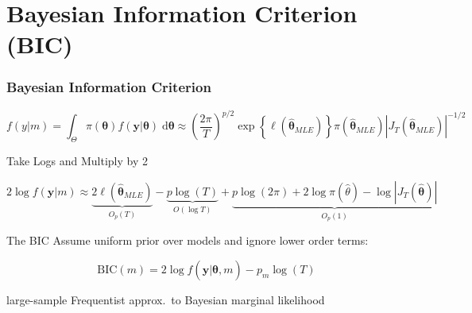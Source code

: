 \section{Bayesian Information Criterion (BIC)}
\begin{frame}
  \frametitle{Bayesian Information Criterion}

  \vspace{-2em}

\footnotesize
  \[
    f(y|m) = \int_\Theta \pi(\boldsymbol{\theta})f(\mathbf{y}|\boldsymbol{\theta})\;\text{d}\boldsymbol{\theta} \approx \left( \frac{2\pi}{T} \right)^{p/2}\exp\left\{ \ell(\widehat{\boldsymbol{\theta}}_{MLE})\right\} \pi(\widehat{\boldsymbol{\theta}}_{MLE})  \left|J_T(\widehat{\boldsymbol{\theta}}_{MLE})\right|^{-1/2}
  \]
  \small

  \vspace{1em}

  \pause

  \begin{block}{Take Logs and Multiply by 2}

    \vspace{-2em}
    \small
    \[2 \log f(\mathbf{y}|m) \approx \underbrace{2 \ell(\widehat{\boldsymbol{\theta}}_{MLE})}_{O_p(T)} - \underbrace{p \log(T)}_{O(\log T)} + \underbrace{p \log (2\pi) + 2\log \pi(\widehat{\theta}) - \log |J_T(\widehat{\boldsymbol{\theta}})|}_{O_p(1)}\]
  \end{block}

  \pause

  \vspace{-2em}

  \begin{block}{The BIC}
    \normalsize
    Assume uniform prior over \alert{models} and ignore lower order terms: 

    \[
      \text{BIC}(m) = 2 \log f(\mathbf{y}|\widehat{\boldsymbol{\theta}},m) - p_m \log(T)
    \]

    large-sample Frequentist approx.\ to Bayesian marginal likelihood
  \end{block}
\end{frame}
